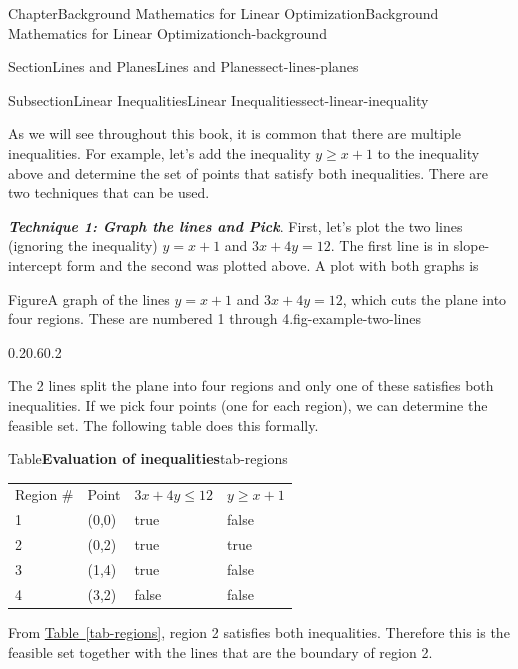 \documentclass[oneside,10pt,]{book}
\newcommand{\tabularfont}{\relax}
\newcommand{\xreffont}{\relax}
\newcommand{\alert}[1]{\textbf{\textit{#1}}}
\numberwithin{equation}{section}
\newcommand{\hrulemedium}{\noalign{\hrule height 0.07em}}
\begin{document}
\begin{chapterptx}{Chapter}{Background Mathematics for Linear Optimization}{}{Background Mathematics for Linear Optimization}{}{}{ch-background}
\begin{sectionptx}{Section}{Lines and Planes}{}{Lines and Planes}{}{}{sect-lines-planes}
\begin{subsectionptx}{Subsection}{Linear Inequalities}{}{Linear Inequalities}{}{}{sect-linear-inequality}
\par
As we will see throughout this book, it is common that there are multiple inequalities. For example, let's add the inequality \(y \geq x+1\) to the inequality above and determine the set of points that satisfy both inequalities. There are two techniques that can be used.%
\par
\alert{Technique 1: Graph the lines and Pick}.   First, let's plot the two lines (ignoring the inequality) \(y=x+1\) and \(3x+4y=12\).  The first line is in slope-intercept form and the second was plotted above.  A plot with both graphs is%
\begin{figureptx}{Figure}{A graph of the lines \(y=x+1\) and \(3x+4y=12\), which cuts the plane into four regions.  These are numbered 1 through 4.}{fig-example-two-lines}{}%
\begin{image}{0.2}{0.6}{0.2}{}%
%
\end{image}%
\tcblower
\end{figureptx}%
The 2 lines split the plane into four regions and only one of these satisfies both inequalities. If we pick four points (one for each region), we can determine the feasible set. The following table does this formally.%
\begin{tableptx}{Table}{\textbf{Evaluation of inequalities}}{tab-regions}{}%
\centering%
{\tabularfont%
\begin{tabular}{llll}
Region \#&Point&\(3x+4y\leq 12\)&\(y \geq x+1\)\tabularnewline\hrulemedium
1&(0,0)&true&false\tabularnewline[0pt]
2&(0,2)&true&true\tabularnewline[0pt]
3&(1,4)&true&false\tabularnewline[0pt]
4&(3,2)&false&false
\end{tabular}
}%
\end{tableptx}%
From \hyperref[tab-regions]{Table~{\xreffont\ref{tab-regions}}}, region 2 satisfies both inequalities. Therefore this is the feasible set together with the lines that are the boundary of region 2.%

\end{subsectionptx}
\end{sectionptx}
\end{chapterptx}
\end{document}
